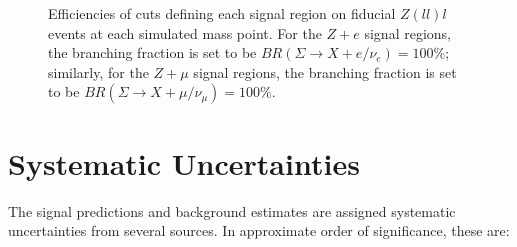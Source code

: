 \begin{figure}[htb]
{	}
	\caption{Efficiencies of cuts defining each signal region on fiducial $Z(ll)l$ events at each simulated mass point. For the $Z+e$ signal regions, the branching fraction is set to be $BR(\Sigma\rightarrow X+e/\nu_{e})=100\%$; similarly, for the $Z+\mu$ signal regions, the branching fraction is set to be $BR(\Sigma\rightarrow X+\mu/\nu_{\mu})=100\%$.}
	\label{fig:fiducial-efficiencies-vs-mass}
\end{figure}




\section{Systematic Uncertainties}\label{sec:resonance-systematic-uncertainties}
The signal predictions and background estimates are assigned systematic uncertainties from several sources. In approximate order of significance, these are:

